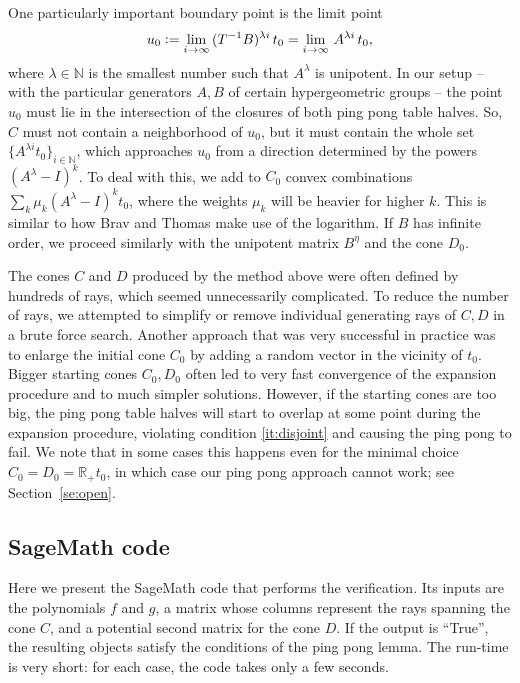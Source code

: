 \documentclass[11pt,a4paper]{amsart}
\theoremstyle{definition}
\theoremstyle{definition}
\numberwithin{equation}{section}
\begin{document}
One particularly important boundary point is the limit point
\[u_0\vcentcolon=\lim_{i\to\infty}\, (T^{-1}B)^{\lambda i}\, t_0=\lim_{i\to\infty}\, A^{\lambda i}\, t_0,\]
where $\lambda\in\mathbb{N}$ is the smallest number such that $A^\lambda$ is unipotent. In our setup -- with the particular generators $A,B$ of certain hypergeometric groups -- the point $u_0$ must lie in the intersection of the closures of both ping pong table halves.
So, $C$ must not contain a neighborhood of $u_0$, but it must contain the whole set $\{A^{\lambda i} t_0\}_{i\in\mathbb{N}}$, which approaches $u_0$ from a direction determined by the powers $(A^\lambda-I)^k$.
To deal with this, we add to $C_0$ convex combinations $\sum_k\mu_k(A^\lambda-I)^k t_0$, where the weights $\mu_k$ will be heavier for higher $k$. This is similar to how Brav and Thomas \cite{BT} make use of the logarithm.
If $B$ has infinite order, we proceed similarly with the unipotent matrix $B^\eta$ and the cone $D_0$.

\medskip

The cones $C$ and $D$ produced by the method above were often defined by hundreds of rays, which seemed unnecessarily complicated. To reduce the number of rays, we attempted to simplify or remove individual generating rays of $C,D$ in a brute force search. Another approach that was very successful in practice was to enlarge the initial cone $C_0$ by adding a random vector in the vicinity of $t_0$.
Bigger starting cones $C_0,D_0$ often led to very fast convergence of the expansion procedure and to much simpler solutions.
However, if the starting cones are too big, the ping pong table halves will start to overlap at some point during the expansion procedure, violating condition \eqref{it:disjoint} and causing the ping pong to fail.
We note that in some cases this happens even for the minimal choice $C_0=D_0=\mathbb{R}_{+}t_0$, in which case our ping pong approach cannot work; see Section~\ref{se:open}.


\subsection{SageMath code}\label{se:code}

Here we present the SageMath code that performs the verification. Its inputs are the polynomials $f$ and $g$, a matrix whose columns represent the rays spanning the cone $C$, and a potential second matrix for the cone $D$. If the output is ``True'', the resulting objects satisfy the conditions of the ping pong lemma. The run-time is very short: for each case, the code takes only a few seconds.
\end{document}
